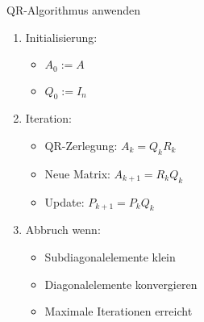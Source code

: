 \begin{KR}{QR-Algorithmus anwenden}
\begin{enumerate}
    \item Initialisierung:
    \begin{itemize}
        \item $A_0 := A$
        \item $Q_0 := I_n$
    \end{itemize}
    
    \item Iteration:
    \begin{itemize}
        \item QR-Zerlegung: $A_k = Q_kR_k$
        \item Neue Matrix: $A_{k+1} = R_kQ_k$
        \item Update: $P_{k+1} = P_kQ_k$
    \end{itemize}
    
    \item Abbruch wenn:
    \begin{itemize}
        \item Subdiagonalelemente klein
        \item Diagonalelemente konvergieren
        \item Maximale Iterationen erreicht
    \end{itemize}
\end{enumerate}
\end{KR}

